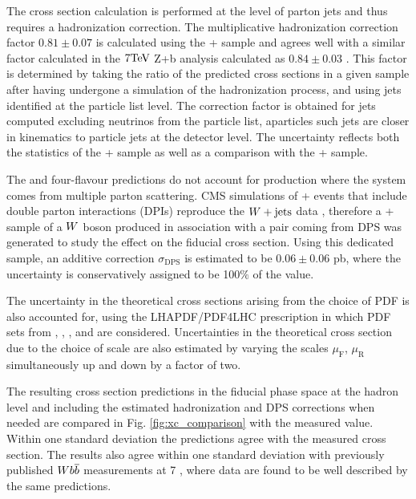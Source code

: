 The \MCFM cross section calculation is
 performed at the level of parton jets and thus
 requires a hadronization correction.
The multiplicative hadronization correction factor $0.81\pm0.07$
 is calculated using the \MADGRAPH + \PYTHIAs sample
 and agrees well with a
 similar factor calculated in the $7\mathrm{TeV}$ Z+b analysis
 calculated as $0.84\pm0.03$  \cite{Chatrchyan:2014dha}.
This factor is determined by 
 taking the ratio of the predicted cross sections
 in a given sample after having undergone a simulation
 of the hadronization process, and using
 jets identified at the particle list level.
The correction factor is obtained for
 jets computed excluding neutrinos from the particle list, aparticles
 such jets are closer in kinematics
 to particle jets at the detector level.
The uncertainty reflects both the statistics of the
 \MADGRAPH + \PYTHIAs sample as well as a comparison with the
 \MADGRAPH + \PYTHIAe sample.

The \MCFM and four-flavour \MADGRAPH predictions do not account for
 \wbb production where the \bbbar system comes from multiple parton scattering.
CMS simulations of \MADGRAPH + \PYTHIA events that include
 double parton interactions (DPIs) reproduce the $W+\mathrm{jets}$ data \cite{Chatrchyan:2013xxa},
 therefore a \MADGRAPH + \PYTHIAe sample of a $W$ boson produced in association with a
 \bbbar pair coming from DPS
 was generated to study the effect on the fiducial cross section.
Using this dedicated sample, an additive correction $\sigma_{\mathrm{DPS}}$
 is estimated to be $0.06\pm0.06$ pb, where the uncertainty
 is conservatively assigned to be 100$\%$ of the value.

The uncertainty in the theoretical cross sections arising
 from the choice of PDF is also accounted for,
 using the LHAPDF/PDF4LHC \cite{LHAPDF,Botje:2011sn,Alekhin:2011sk,Ball:2012cx}
 prescription in which
 PDF sets from \CTEQ, \MSTW, \NNPDF, and \HERA are considered.
Uncertainties in the theoretical cross section due to the
 choice of scale are also estimated by varying the scales
 $\mu_{\mathrm{F}}$, $\mu_{\mathrm{R}}$ simultaneously
 up and down by a factor of two.

The resulting cross section predictions in the fiducial
 phase space at the hadron level and including the estimated
 hadronization and DPS corrections when needed
 are compared in Fig. \ref{fig:xc_comparison}
 with the measured value.
Within one standard deviation the predictions agree with the measured cross section.
The results also agree within one standard deviation with previously published $W b\overline{b}$
 measurements at 7 \TeV, where
 data are found to be well described by the same predictions.

